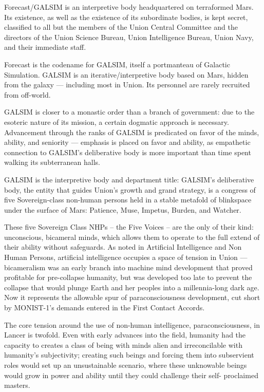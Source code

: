 Forecast/GALSIM is an interpretive body headquartered on terraformed Mars. Its existence, as
well as the existence of its subordinate bodies, is kept secret, classified to all but the members of
the Union Central Committee and the directors of the Union Science Bureau, Union Intelligence
Bureau, Union Navy, and their immediate staff.


Forecast is the codename for GALSIM, itself a portmanteau of Galactic Simulation. GALSIM is an
iterative/interpretive body based on Mars, hidden from the galaxy — including most in Union. Its
personnel are rarely recruited from off-world.


GALSIM is closer to a monastic order than a branch of government: due to the esoteric nature of
its mission, a certain dogmatic approach is necessary. Advancement through the ranks of
GALSIM is predicated on favor of the minds, ability, and seniority — emphasis is placed on favor
and ability, as empathetic connection to GALSIM’s deliberative body is more important than time
spent walking its subterranean halls.


GALSIM is the interpretive body and department title: GALSIM’s deliberative body, the entity that
guides Union’s growth and grand strategy, is a congress of five Sovereign-class non-human
persons held in a stable metafold of blinkspace under the surface of Mars: Patience, Muse,
Impetus, Burden, and Watcher.


These five Sovereign Class NHPs -- the Five Voices -- are the only of their kind: unconscious,
bicameral minds, which allows them to operate to the full extend of their ability without
safeguards. As noted in Artificial Intelligence and Non Human Persons, artificial intelligence
occupies a space of tension in Union — bicameralism was an early branch into machine mind
development that proved profitable for pre-collapse humanity, but was developed too late to
prevent the collapse that would plunge Earth and her peoples into a millennia-long dark age.
Now it represents the allowable spur of paraconsciousness development, cut short by
MONIST-1’s demands entered in the First Contact Accords.





The core tension around the use of non-human intelligence, paraconsciousness, in Lancer is
twofold. Even with early advances into the field, humanity had the capacity to creates a class of
being with minds alien and irreconcilable with humanity’s subjectivity; creating such beings and
forcing them into subservient roles would set up an unsustainable scenario, where these
unknowable beings would grow in power and ability until they could challenge their self-
proclaimed masters.


